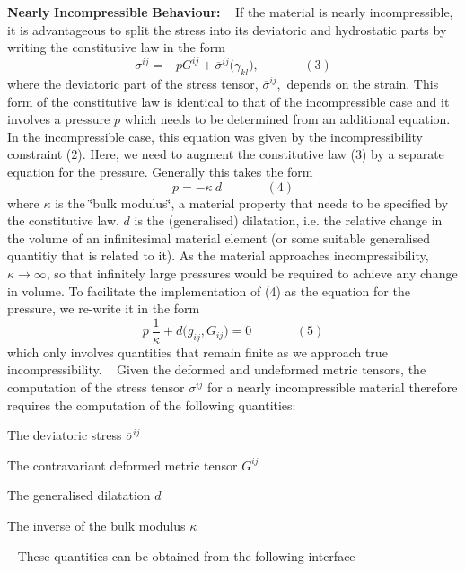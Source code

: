 \begin{DoxyEnumerate}
\item {\bfseries Nearly} {\bfseries Incompressible} {\bfseries Behaviour\+:} ~\newline
 If the material is nearly incompressible, it is advantageous to split the stress into its deviatoric and hydrostatic parts by writing the constitutive law in the form \[ \sigma^{ij} = -p G^{ij} + \overline{\sigma}^{ij}\big(\gamma_{kl}\big), \ \ \ \ \ \ \ \ \ \ \ \ \ \ \ \ (3) \] where the deviatoric part of the stress tensor, $ \overline{\sigma}^{ij}, $ depends on the strain. This form of the constitutive law is identical to that of the incompressible case and it involves a pressure $ p $ which needs to be determined from an additional equation. In the incompressible case, this equation was given by the incompressibility constraint (2). Here, we need to augment the constitutive law (3) by a separate equation for the pressure. Generally this takes the form \[ p = - \kappa \ d \ \ \ \ \ \ \ \ \ \ \ \ \ \ \ \ (4) \] where $ \kappa $ is the \char`\"{}bulk modulus\char`\"{}, a material property that needs to be specified by the constitutive law. $ d $ is the (generalised) dilatation, i.\+e. the relative change in the volume of an infinitesimal material element (or some suitable generalised quantitiy that is related to it). As the material approaches incompressibility, $ \kappa \to \infty$, so that infinitely large pressures would be required to achieve any change in volume. To facilitate the implementation of (4) as the equation for the pressure, we re-\/write it in the form \[ p \ \frac{1}{\kappa} + d\big(g_{ij},G_{ij}\big) = 0 \ \ \ \ \ \ \ \ \ \ \ \ \ \ \ \ (5) \] which only involves quantities that remain finite as we approach true incompressibility. ~\newline
 Given the deformed and undeformed metric tensors, the computation of the stress tensor $ \sigma^{ij} $ for a nearly incompressible material therefore requires the computation of the following quantities\+:
\begin{DoxyItemize}
\item The deviatoric stress $ \overline{\sigma}^{ij} $
\item The contravariant deformed metric tensor $ G^{ij} $
\item The generalised dilatation $ d $
\item The inverse of the bulk modulus $ \kappa $
\end{DoxyItemize}~\newline
 These quantities can be obtained from the following interface ~\newline


\end{DoxyEnumerate}
